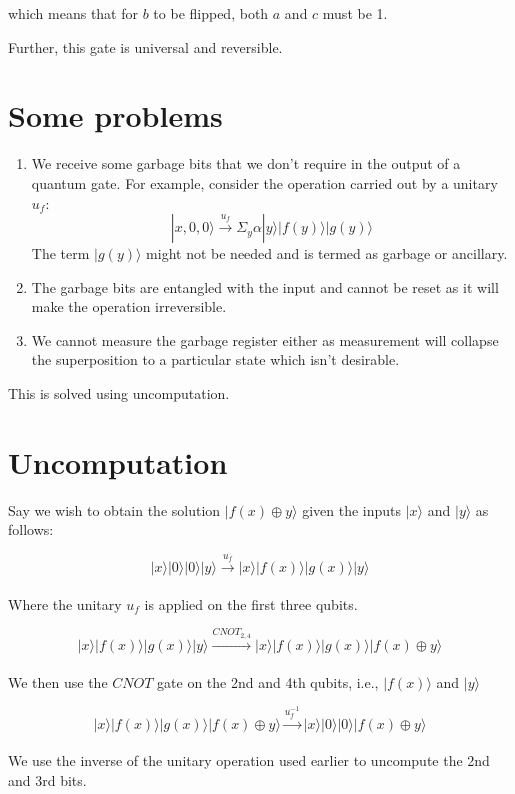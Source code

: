 \documentclass{article}
\begin{document}
which means that for $b$ to be flipped, both $a$ and $c$ must be 1.

Further, this gate is universal and reversible.

\section{Some problems}

\begin{enumerate}
	\item We receive some garbage bits that we don't require in the output of a quantum gate. For example, consider the operation carried out by a unitary $u_f$:
	      $$|x,0,0\rangle \xrightarrow[]{u_f} \Sigma_y \alpha |y\rangle |f(y)\rangle |g(y)\rangle $$
	      The term $|g(y)\rangle$ might not be needed and is termed as garbage or ancillary.
	\item The garbage bits are entangled with the input and cannot be reset as it will make the operation irreversible.
	\item We cannot measure the garbage register either as measurement will collapse the superposition to a particular state which isn't desirable.
\end{enumerate}
This is solved using uncomputation.

\section {Uncomputation}

Say we wish to obtain the solution $|f(x)\oplus y \rangle$ given the inputs $|x\rangle$ and $|y\rangle$ as follows:

$$|x\rangle |0\rangle |0\rangle |y\rangle \xrightarrow[]{u_f} |x\rangle |f(x)\rangle |g(x)\rangle |y\rangle$$

Where the unitary $u_f$ is applied on the first three qubits.

$$|x\rangle |f(x)\rangle |g(x)\rangle |y\rangle \xrightarrow[]{CNOT_{2,4}} |x\rangle |f(x)\rangle |g(x)\rangle |f(x) \oplus y\rangle$$

We then use the $CNOT$ gate on the 2nd and 4th qubits, i.e., $|f(x)\rangle$ and $|y\rangle$

$$|x\rangle |f(x)\rangle |g(x)\rangle |f(x) \oplus y\rangle \xrightarrow[]{u^{-1}_f} |x\rangle |0\rangle |0\rangle |f(x) \oplus y\rangle$$

We use the inverse of the unitary operation used earlier to uncompute the 2nd and 3rd bits.
\end{document}
